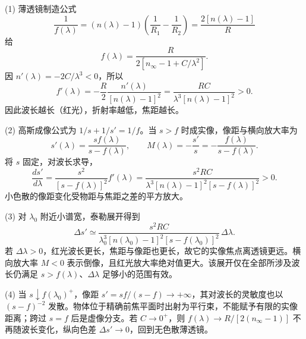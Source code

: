(1) 薄透镜制造公式
\[
\frac1{f(\lambda)}=(n(\lambda)-1)\left(\frac1{R_1}-\frac1{R_2}\right)
=\frac{2[n(\lambda)-1]}R
\]
给
\[
f(\lambda)=\frac{R}{2[n_\infty-1+C/\lambda^2]}.
\]
因 \(n'(\lambda)=-2C/\lambda^3<0\)，所以
\[
f'(\lambda)=-\frac R2\frac{n'(\lambda)}{[n(\lambda)-1]^2}
=\frac{RC}{\lambda^3[n(\lambda)-1]^2}>0.
\]
因此波长越长（红光），折射率越低，焦距越长。

(2) 高斯成像公式为 \(1/s+1/s'=1/f\)。当 \(s>f\) 时成实像，像距与横向放大率为
\[
s'(\lambda)=\frac{s f(\lambda)}{s-f(\lambda)},\qquad
M(\lambda)=-\frac{s'}s=-\frac{f(\lambda)}{s-f(\lambda)}.
\]
将 \(s\) 固定，对波长求导，
\[
\frac{ds'}{d\lambda}=\frac{s^2}{[s-f(\lambda)]^2}f'(\lambda)
=\frac{s^2RC}{\lambda^3[n(\lambda)-1]^2[s-f(\lambda)]^2}>0.
\]
小色散的像距变化受物距与焦距之差的平方放大。

(3) 对 \(\lambda_0\) 附近小谱宽，泰勒展开得到
\[
\Delta s'\simeq
\frac{s^2RC}{\lambda_0^3[n(\lambda_0)-1]^2[s-f(\lambda_0)]^2}\,\Delta\lambda.
\]
若 \(\Delta\lambda>0\)，红光波长更长，焦距与像距也更长，故它的实像焦点离透镜更远。横向放大率 \(M<0\) 表示倒像，且红光放大率绝对值更大。该展开仅在全部所涉及波长仍满足 \(s>f(\lambda)\)、\(\Delta\lambda\) 足够小的范围有效。

(4) 当 \(s\downarrow f(\lambda_0)^+\)，像距 \(s'=sf/(s-f)\to+\infty\)，其对波长的灵敏度也以 \((s-f)^{-2}\) 发散。物体位于精确前焦平面时出射为平行束，不能赋予有限的实像距离；跨过 \(s=f\) 后是虚像分支。若 \(C\to0^+\)，则 \(f(\lambda)\to R/[2(n_\infty-1)]\) 不再随波长变化，纵向色差 \(\Delta s'\to0\)，回到无色散薄透镜。
